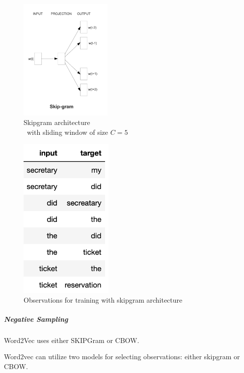             \begin{figure}[ht]
                \centering
                \includegraphics[height=6cm]{Bilder/word2vec/architecture_skipgram.png}
                \caption{Skipgram architecture\\\ with sliding window of size $C=5$ }
                \label{fig:cbow-architecture}
            \end{figure}
        
            \begin{figure}[ht]
                \centering
                \includegraphics[height=8cm]{Bilder/word2vec/skipgram.png}
                \caption{Observations for training with skipgram architecture}
                \label{fig:cbow-architecture}
            \end{figure}
            
            
            \subparagraph{Negative Sampling}
            
            
            Word2Vec uses either SKIPGram or CBOW.
            
            Word2vec can utilize two models for selecting observations: either skipgram or \ac{CBOW}. 
            
    